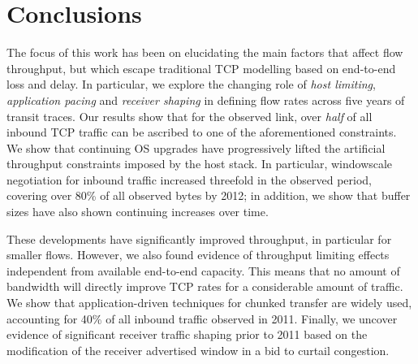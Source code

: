 \section{Conclusions}
\label{section:malawi:conclusion}

The focus of this work has been on elucidating the main factors that affect flow throughput, but which escape traditional TCP modelling based on end-to-end loss and delay. 
In particular, we explore the changing role of \emph{host limiting}, \emph{application pacing} and \emph{receiver shaping} in defining flow rates across five years of transit traces.
Our results show that for the observed link, over \emph{half} of all inbound TCP traffic can be ascribed to one of the aforementioned constraints.
We show that continuing OS upgrades have progressively lifted the artificial throughput constraints imposed by the host stack. In particular, windowscale negotiation for inbound traffic increased threefold in the observed period, covering over 80\% of all observed bytes by 2012; in addition, we show that buffer sizes have also shown continuing increases over time.

These developments have significantly improved throughput, in particular for smaller flows. However, we also found evidence of throughput limiting effects independent from available end-to-end capacity. This means that no amount of bandwidth will directly improve TCP rates for a considerable amount of traffic.
We show that application-driven techniques for chunked transfer are widely used, accounting for 40\% of all inbound traffic observed in 2011.
Finally, we uncover evidence of significant receiver traffic shaping prior to 2011 based on the modification of the receiver advertised window in a bid to curtail congestion.

